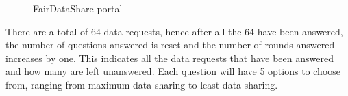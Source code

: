 \begin{figure}[htp]
  \hspace{1em}
  \caption{FairDataShare portal}
  \label{fig:bid}
\end{figure}


There are a total of 64 data requests, hence after all the 64 have been answered, the number of questions answered is reset and the number of rounds answered increases by one. This indicates all the data requests that have been answered and how many are left unanswered. Each question will have 5 options to choose from, ranging from maximum data sharing to least data sharing.

